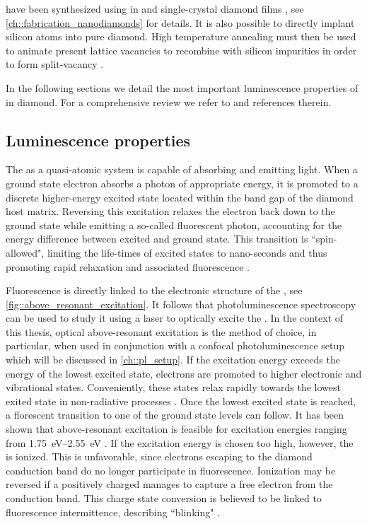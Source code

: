  \sivs have been synthesized using \CVD in \nds and single-crystal diamond films \cite{Neu2011b}, see \cref{ch::fabrication_nanodiamonds} for details. It is also possible to directly implant silicon atoms into pure diamond. High temperature annealing must then be used to animate present lattice vacancies to recombine with silicon impurities in order to form split-vacancy \sivs \cite{Collins1983,Hepp2014}.

  In the following sections we detail the most important luminescence properties of \sivs in diamond. For a comprehensive review we refer to \cite{Riedrich-moller2014, neu2012} and references therein.


  \subsection{Luminescence properties}

    The \sivc as a quasi-atomic system is capable of absorbing and emitting light. When a ground state electron absorbs a photon of appropriate energy, it is promoted to a discrete higher-energy excited state located within the band gap of the diamond host matrix. Reversing this excitation relaxes the electron back down to the ground state while emitting a so-called fluorescent photon, accounting for the energy difference between excited and ground state. This transition is ``spin-allowed", limiting the life-times of excited states to nano-seconds and thus promoting rapid relaxation and associated fluorescence \cite{Gali2013b}.

    Fluorescence is directly linked to the electronic structure of the \siv, see \cref{fig::above_resonant_excitation}. It follows that photoluminescence spectroscopy can be used to study it using a laser to optically excite the \siv. In the context of this thesis, optical above-resonant excitation is the method of choice, in particular, when used in conjunction with a confocal photoluminescence setup which will be discussed in \cref{ch::pl_setup}. 
    If the excitation energy exceeds the energy of the lowest excited state, electrons are promoted to higher electronic and vibrational states. Conveniently, these states relax rapidly towards the lowest exited state in non-radiative processes \cite{Gali2013b}. Once the lowest excited state is reached, a florescent transition to one of the ground state levels can follow. It has been shown that above-resonant excitation is feasible for excitation energies ranging from \SIrange{1.75}{2.55}{\eV} \cite{becker::34, Iakoubovskii2000, Rossi1997}. If the excitation energy is chosen too high, however, the \siv is ionized. This is unfavorable, since electrons escaping to the diamond conduction band do no longer participate in fluorescence. Ionization may be reversed if a positively charged \siv manages to capture a free electron from the conduction band. This charge state conversion is believed to be linked to fluorescence intermittence, describing ``blinking" \sivs \cite{Muller2011, Siyushev2009}.


